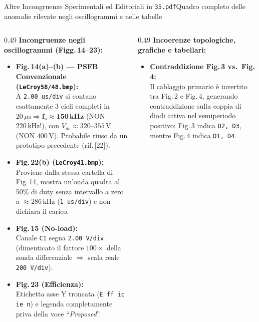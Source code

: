 \documentclass[aspectratio=169,9pt]{beamer}
\newcommand{\V}{\,\text{V}}
\newcommand{\kHz}{\,\text{kHz}}
\newcommand{\us}{\,\mu\text{s}}
\begin{document}
\begin{frame}{Altre Incongruenze Sperimentali ed Editoriali in \texttt{35.pdf}}{Quadro completo delle anomalie rilevate negli oscillogrammi e nelle tabelle}
  \begin{columns}[T,onlytextwidth]
    \begin{column}{0.49\textwidth}
      \scriptsize
      \textbf{\color{PrimaryBlue}Incongruenze negli oscillogrammi (Figg.\,14--23):}
      \begin{itemize}\setlength{\itemsep}{3.5pt}
        \item \textbf{Fig.\,14(a)--(b) --- PSFB Convenzionale (\texttt{LeCroy58/48.bmp}):}\\
              A \texttt{2.00 us/div} si contano esattamente 3 cicli completi in $20\us \Rightarrow \mathbf{f_s \approx 150\kHz}$ (NON $220\kHz$!), con $V_{dc}\approx 320\text{--}355\V$ (NON $400\V$). Probabile riuso da un prototipo precedente (rif.\,[22]).
        \item \textbf{Fig.\,22(b) (\texttt{LeCroy41.bmp}):}\\
              Proviene dalla stessa cartella di Fig.\,14, mostra un'onda quadra al 50\% di duty senza intervallo a zero a $\approx 286\kHz$ (\texttt{1 us/div}) e non dichiara il carico.
        \item \textbf{Fig.\,15 (No-load):}\\
              Canale \texttt{C1} segna \texttt{2.00 V/div} (dimenticato il fattore $100\times$ della sonda differenziale $\Rightarrow$ scala reale \texttt{200 V/div}).
        \item \textbf{Fig.\,23 (Efficienza):}\\
              Etichetta asse Y troncata (\texttt{E ff ic ie n}) e legenda completamente priva della voce ``\emph{Proposed}''.
      \end{itemize}
    \end{column}
    \begin{column}{0.49\textwidth}
      \scriptsize
      \textbf{\color{PrimaryBlue}Incoerenze topologiche, grafiche e tabellari:}
      \begin{itemize}\setlength{\itemsep}{3.5pt}
        \item \textbf{Contraddizione Fig.\,3 vs.\ Fig.\,4:}\\
              Il cablaggio primario \`e invertito tra Fig.\,2 e Fig.\,4, generando contraddizione sulla coppia di diodi attiva nel semiperiodo positivo: Fig.\,3 indica \texttt{D2, D3}, mentre Fig.\,4 indica \texttt{D1, D4}.

\end{itemize}
\end{column}
\end{columns}
\end{frame}
\end{document}
